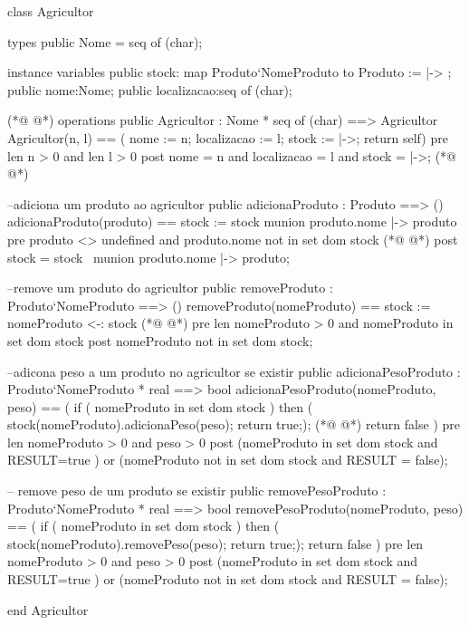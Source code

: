 \begin{vdmpp}[breaklines=true]
class Agricultor

types 
 public Nome = seq of (char);
 
instance variables
  public stock: map Produto`NomeProduto to Produto := { |-> };
  public nome:Nome;
  public localizacao:seq of (char);

(*@
\label{Agricultor:11}
@*)
operations
  public  Agricultor : Nome * seq of (char) ==> Agricultor
   Agricultor(n, l) == ( nome := n; localizacao := l; stock := {|->}; return self)
  pre len n > 0 and len l > 0
  post nome = n and localizacao = l and stock = {|->};
(*@
\label{adicionaProduto:16}
@*)
 
 --adiciona um produto ao agricultor
  public  adicionaProduto : Produto ==> ()
   adicionaProduto(produto) == stock := stock munion {produto.nome |-> produto}
  pre produto <> undefined and produto.nome not in set dom stock
(*@
\label{removeProduto:21}
@*)
  post  stock = stock~ munion {produto.nome |-> produto};

 --remove um produto do agricultor
  public removeProduto : Produto`NomeProduto ==> ()
   removeProduto(nomeProduto) == stock := {nomeProduto} <-: stock
(*@
\label{adicionaPesoProduto:26}
@*)
  pre len nomeProduto > 0 and nomeProduto in set dom stock
  post nomeProduto not in set dom stock;
  
  --adicona peso a um produto no agricultor se existir 
  public  adicionaPesoProduto : Produto`NomeProduto * real ==> bool
  adicionaPesoProduto(nomeProduto, peso) == 
   (
    if ( nomeProduto in set dom stock ) 
     then  ( stock(nomeProduto).adicionaPeso(peso); return true;);
(*@
\label{removePesoProduto:35}
@*)
    return false
   )
  pre len nomeProduto > 0 and peso > 0
  post (nomeProduto in set dom stock and RESULT=true ) or (nomeProduto not in set dom stock and RESULT = false);
  
  
  -- remove peso de um produto se existir 
  public  removePesoProduto : Produto`NomeProduto * real ==> bool
  removePesoProduto(nomeProduto, peso) ==
    (
    if ( nomeProduto in set dom stock ) 
     then  ( stock(nomeProduto).removePeso(peso); return true;);
    return false
   )
  pre len nomeProduto > 0 and peso > 0
  post (nomeProduto in set dom stock and RESULT=true ) or (nomeProduto not in set dom stock and RESULT = false);


end Agricultor
\end{vdmpp}
\bigskip
